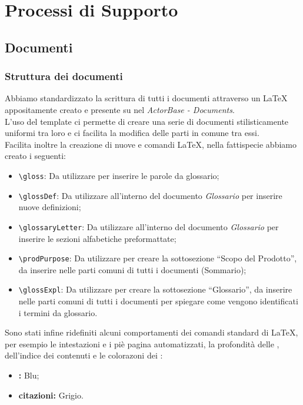 \documentclass{scalatekids-article}
\begin{document}
\section{Processi di Supporto}
\subsection{Documenti}
\subsubsection{Struttura dei documenti}
Abbiamo standardizzato la scrittura di tutti i documenti attraverso un
 \LaTeX\xspace appositamente creato e presente su
\textit{} nel  \textit{ActorBase -
  Documents}.\\ L'uso del template ci permette di creare una serie di documenti
stilisticamente uniformi tra loro e ci facilita la modifica delle parti in
comune tra essi.\\Facilita inoltre la creazione di nuove  e comandi
\LaTeX\xspace, nella fattispecie abbiamo creato i seguenti:
\begin{itemize}
\item\verb=\gloss=: Da utilizzare per inserire le parole da glossario;
\item\verb=\glossDef=: Da utilizzare all'interno del documento \textit{Glossario} per inserire nuove definizioni;
\item\verb=\glossaryLetter=: Da utilizzare all'interno del documento \textit{Glossario} per inserire le sezioni alfabetiche preformattate;
\item\verb=\prodPurpose=: Da utilizzare per creare la sottosezione ``Scopo del Prodotto'', da inserire nelle parti comuni di tutti i documenti (Sommario);
\item\verb=\glossExpl=: Da utilizzare per creare la sottosezione ``Glossario'', da inserire nelle parti comuni di tutti i documenti per spiegare come vengono identificati i termini da glossario.
\end{itemize}
Sono stati infine ridefiniti alcuni comportamenti dei comandi standard di
\LaTeX\xspace, per esempio le intestazioni e i piè pagina automatizzati, la
profondità delle , dell'indice dei contenuti e le colorazoni dei
:
\begin{itemize}
\item\textbf{:} Blu;
\item\textbf{citazioni:} Grigio.
\end{itemize}
\end{document}
